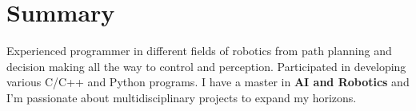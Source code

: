 
\section{Summary}
  \vspace{2pt}
  \resumeSubHeadingListStart
  \item{Experienced programmer in different fields of robotics from path planning and decision making all the way to control and perception. Participated in developing various C/C++ and Python programs. I have a master in \textbf{AI and Robotics} and I'm passionate about multidisciplinary projects to expand my horizons.}
  \resumeSubHeadingListEnd

